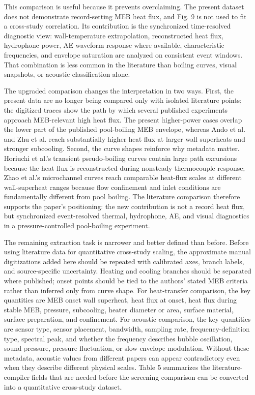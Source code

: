 \documentclass[final,1p,times]{elsarticle}
\begin{document}
This comparison is useful because it prevents overclaiming. The present dataset does not demonstrate record-setting MEB heat flux, and Fig. 9 is not used to fit a cross-study correlation. Its contribution is the synchronized time-resolved diagnostic view: wall-temperature extrapolation, reconstructed heat flux, hydrophone power, AE waveform response where available, characteristic frequencies, and envelope saturation are analyzed on consistent event windows. That combination is less common in the literature than boiling curves, visual snapshots, or acoustic classification alone.

The upgraded comparison changes the interpretation in two ways. First, the present data are no longer being compared only with isolated literature points; the digitized traces show the path by which several published experiments approach MEB-relevant high heat flux. The present higher-power cases overlap the lower part of the published pool-boiling MEB envelope, whereas Ando et al. and Zhu et al. reach substantially higher heat flux at larger wall superheats and stronger subcooling. Second, the curve shapes reinforce why metadata matter. Horiuchi et al.'s transient pseudo-boiling curves contain large path excursions because the heat flux is reconstructed during nonsteady thermocouple response; Zhao et al.'s microchannel curves reach comparable heat-flux scales at different wall-superheat ranges because flow confinement and inlet conditions are fundamentally different from pool boiling. The literature comparison therefore supports the paper's positioning: the new contribution is not a record heat flux, but synchronized event-resolved thermal, hydrophone, AE, and visual diagnostics in a pressure-controlled pool-boiling experiment.

The remaining extraction task is narrower and better defined than before. Before using literature data for quantitative cross-study scaling, the approximate manual digitizations added here should be repeated with calibrated axes, branch labels, and source-specific uncertainty. Heating and cooling branches should be separated where published; onset points should be tied to the authors' stated MEB criteria rather than inferred only from curve shape. For heat-transfer comparison, the key quantities are MEB onset wall superheat, heat flux at onset, heat flux during stable MEB, pressure, subcooling, heater diameter or area, surface material, surface preparation, and confinement. For acoustic comparison, the key quantities are sensor type, sensor placement, bandwidth, sampling rate, frequency-definition type, spectral peak, and whether the frequency describes bubble oscillation, sound pressure, pressure fluctuation, or slow envelope modulation. Without these metadata, acoustic values from different papers can appear contradictory even when they describe different physical scales. Table 5 summarizes the literature-compiler fields that are needed before the screening comparison can be converted into a quantitative cross-study dataset.
\end{document}
